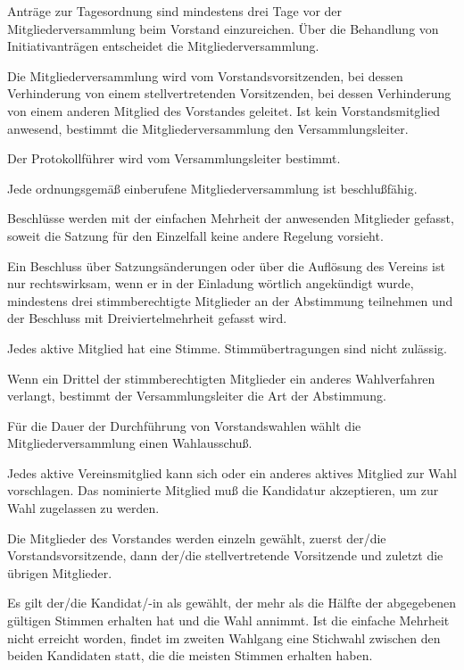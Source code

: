 \documentclass[draft]{scrartcl}
\begin{document}
\begin{contract}
Anträge zur Tagesordnung sind mindestens drei Tage vor der
Mitgliederversammlung beim Vorstand einzureichen. Über die Behandlung von
Initiativanträgen entscheidet die Mitgliederversammlung.


Die Mitgliederversammlung wird vom Vorstandsvorsitzenden, bei dessen
Verhinderung von einem stellvertretenden Vorsitzenden, bei dessen Verhinderung
von einem anderen Mitglied des Vorstandes geleitet. Ist kein Vorstandsmitglied
anwesend, bestimmt die Mitgliederversammlung den Versammlungsleiter.

Der Protokollführer wird vom Versammlungsleiter bestimmt.


Jede ordnungsgemäß einberufene Mitgliederversammlung ist beschlußfähig.

Beschlüsse werden mit der einfachen Mehrheit der anwesenden Mitglieder gefasst,
soweit die Satzung für den Einzelfall keine andere Regelung vorsieht.

Ein Beschluss über Satzungsänderungen oder über die Auflösung des Vereins ist
nur rechtswirksam, wenn er in der Einladung wörtlich angekündigt wurde,
mindestens drei stimmberechtigte Mitglieder an der Abstimmung teilnehmen und
der Beschluss mit Dreiviertelmehrheit gefasst wird.\label{MV-Aufloesung}


Jedes aktive Mitglied hat eine Stimme. Stimmübertragungen sind nicht
zulässig.\label{Stimmrechte}

Wenn ein Drittel der stimmberechtigten Mitglieder ein anderes
Wahlverfahren verlangt, bestimmt der Versammlungsleiter die Art der
Abstimmung.

Für die Dauer der Durchführung von Vorstandswahlen wählt die
Mitgliederversammlung einen Wahlausschuß.

Jedes aktive Vereinsmitglied kann sich oder ein anderes aktives Mitglied zur
Wahl vorschlagen. Das nominierte Mitglied muß die Kandidatur akzeptieren, um
zur Wahl zugelassen zu werden.

Die Mitglieder des Vorstandes werden einzeln gewählt, zuerst der/die
Vorstandsvorsitzende, dann der/die stellvertretende Vorsitzende und zuletzt
die übrigen Mitglieder.

Es gilt der/die Kandidat/-in als gewählt, der mehr als die Hälfte der
abgegebenen gültigen Stimmen erhalten hat und die Wahl annimmt. Ist die
einfache Mehrheit nicht erreicht worden, findet im zweiten Wahlgang eine
Stichwahl zwischen den beiden Kandidaten statt, die die meisten Stimmen
erhalten haben.


\end{contract}
\end{document}
